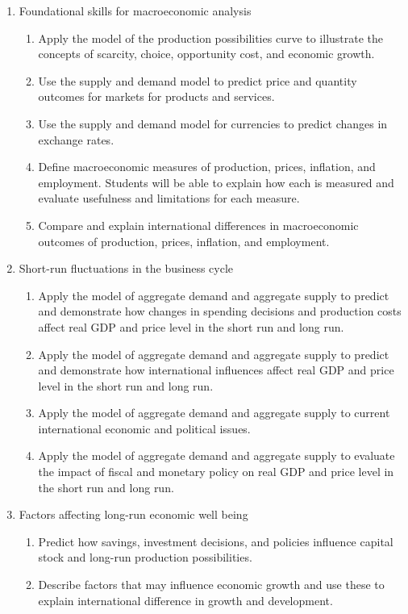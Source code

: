 \documentclass[
    letterpaper,paper=portrait,fleqn,
    DIV=16,fontsize=11pt,twoside=semi,
    parskip=full-,
    headings=standardclasses]
{scrartcl}
\begin{document}
\begin{enumerate}

\item Foundational skills for macroeconomic analysis

\begin{enumerate}[nolistsep,noitemsep,label*=\arabic*.]
\item Apply the model of the production possibilities curve to illustrate the concepts of scarcity, choice, opportunity cost, and economic growth.
\item Use the supply and demand model to predict price and quantity outcomes for markets for products and services.
\item Use the supply and demand model for currencies to predict changes in exchange rates.
\item Define macroeconomic measures of production, prices, inflation, and employment.  Students will be able to explain how each is measured and evaluate usefulness and limitations for each measure.
\item Compare and explain international differences in macroeconomic outcomes of production, prices, inflation, and employment.
\end{enumerate}

\item Short-run fluctuations in the business cycle

\begin{enumerate}[nolistsep,noitemsep,label*=\arabic*.]
\item Apply the model of aggregate demand and aggregate supply to predict and demonstrate how changes in spending decisions and production costs affect real GDP and price level in the short run and long run.
\item Apply the model of aggregate demand and aggregate supply to predict and demonstrate how international influences affect real GDP and price level in the short run and long run.
\item Apply the model of aggregate demand and aggregate supply to current international economic and political issues.
\item Apply the model of aggregate demand and aggregate supply to evaluate the impact of fiscal and monetary policy on real GDP and price level in the short run and long run.
\end{enumerate}

\item Factors affecting long-run economic well being

\begin{enumerate}[nolistsep,noitemsep,label*=\arabic*.]
\item Predict how savings, investment decisions, and policies influence capital stock and long-run production possibilities.
\item Describe factors that may influence economic growth and use these to explain international difference in growth and development.
\end{enumerate}

\end{enumerate}
\end{document}
